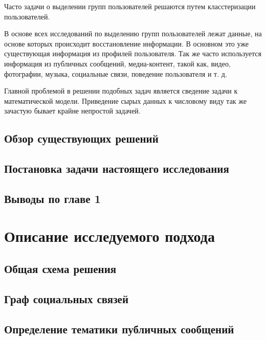 \documentclass[annotation,times,page4]{itmo-student-thesis}
\begin{document}
Часто задачи о выделении групп пользователей решаются путем класстеризации пользователей.

В основе всех исследований по выделению групп пользователей лежат данные, на основе которых происходит восстановление информации. В основном это уже существующая информация из профилей пользователя. Так же часто используется информация из публичных сообщений, медиа-контент, такой как, видео, фотографии, музыка, социальные связи, поведение пользователя и т. д.

Главной проблемой в решении подобных задач является сведение задачи к математической модели. Приведение сырых данных к числовому виду так же зачастую бывает крайне непростой задачей.
  
\section{Обзор существующих решений}


\section{Постановка задачи настоящего исследования}
\section{Выводы по главе 1}

\chapter{Описание исследуемого подхода}
\section{Общая схема решения}
\section{Граф социальных связей}
\section{Определение тематики публичных сообщений}
\end{document}
